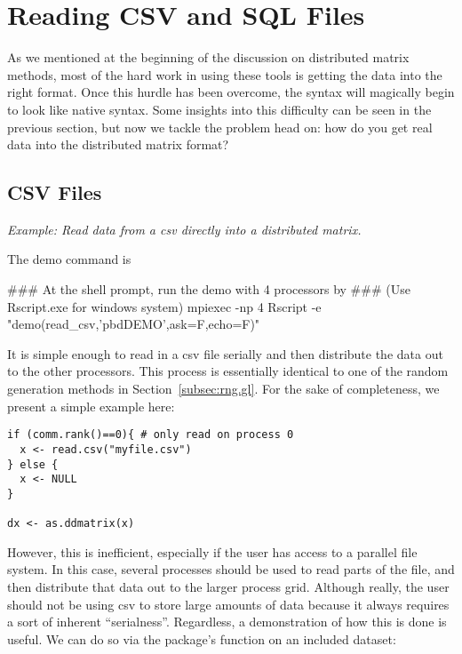 \chapter[Readers]{Reading CSV and SQL Files}
\label{sec:reader}


\vspace{0.5cm}


As we mentioned at the beginning of the discussion on distributed matrix methods, most of the hard work in using these tools is getting the data into the right format.  Once this hurdle has been overcome, the syntax will magically begin to look like native  syntax.  Some insights into this difficulty can be seen in the previous section, but now we tackle the problem head on:  how do you get real data into the distributed matrix format?

\section{CSV Files}
\label{sec:csv_files}

\emph{Example:  Read data from a csv directly into a distributed matrix.}

The demo command is
\begin{Command}
### At the shell prompt, run the demo with 4 processors by
### (Use Rscript.exe for windows system)
mpiexec -np 4 Rscript -e "demo(read_csv,'pbdDEMO',ask=F,echo=F)"
\end{Command}

It is simple enough to read in a csv file serially and then distribute the data out to the other processors.  This process is essentially identical to one of the random generation methods in Section~\ref{subsec:rng.gl}.  For the sake of completeness, we present a simple example here:

\begin{lstlisting}[language=rr]
if (comm.rank()==0){ # only read on process 0
  x <- read.csv("myfile.csv")
} else {
  x <- NULL
}

dx <- as.ddmatrix(x)
\end{lstlisting}

However, this is inefficient, especially if the user has access to a parallel file system.  In this case, several processes should be used to read parts of the file, and then distribute that data out to the larger process grid.  Although really, the user should not be using csv to store large amounts of data because it always requires a sort of inherent ``serialness''.  Regardless, a demonstration of how this is done is useful.  We can do so via the  package's function  on an included dataset:

